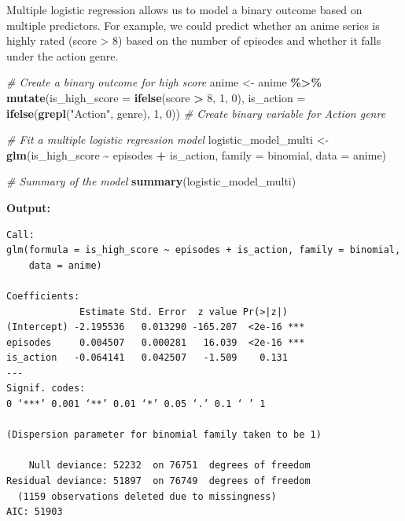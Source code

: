 \documentclass[
]{book}
\newenvironment{Shaded}{\begin{snugshade}}{\end{snugshade}}
\newcommand{\AttributeTok}[1]{\textcolor[rgb]{0.13,0.29,0.53}{#1}}
\newcommand{\CommentTok}[1]{\textcolor[rgb]{0.56,0.35,0.01}{\textit{#1}}}
\newcommand{\DecValTok}[1]{\textcolor[rgb]{0.00,0.00,0.81}{#1}}
\newcommand{\FunctionTok}[1]{\textcolor[rgb]{0.13,0.29,0.53}{\textbf{#1}}}
\newcommand{\NormalTok}[1]{#1}
\newcommand{\OtherTok}[1]{\textcolor[rgb]{0.56,0.35,0.01}{#1}}
\newcommand{\SpecialCharTok}[1]{\textcolor[rgb]{0.81,0.36,0.00}{\textbf{#1}}}
\newcommand{\StringTok}[1]{\textcolor[rgb]{0.31,0.60,0.02}{#1}}
\begin{document}
Multiple logistic regression allows us to model a binary outcome based on multiple predictors. For example, we could predict whether an anime series is highly rated (score \textgreater{} 8) based on the number of episodes and whether it falls under the action genre.

\begin{Shaded}
\begin{Highlighting}[]
\CommentTok{\# Create a binary outcome for high score}
\NormalTok{anime }\OtherTok{\textless{}{-}}\NormalTok{ anime }\SpecialCharTok{\%\textgreater{}\%}
  \FunctionTok{mutate}\NormalTok{(}\AttributeTok{is\_high\_score =} \FunctionTok{ifelse}\NormalTok{(score }\SpecialCharTok{\textgreater{}} \DecValTok{8}\NormalTok{, }\DecValTok{1}\NormalTok{, }\DecValTok{0}\NormalTok{),}
         \AttributeTok{is\_action =} \FunctionTok{ifelse}\NormalTok{(}\FunctionTok{grepl}\NormalTok{(}\StringTok{"Action"}\NormalTok{, genre), }\DecValTok{1}\NormalTok{, }\DecValTok{0}\NormalTok{))  }\CommentTok{\# Create binary variable for Action genre}

\CommentTok{\# Fit a multiple logistic regression model}
\NormalTok{logistic\_model\_multi }\OtherTok{\textless{}{-}} \FunctionTok{glm}\NormalTok{(is\_high\_score }\SpecialCharTok{\textasciitilde{}}\NormalTok{ episodes }\SpecialCharTok{+}\NormalTok{ is\_action, }\AttributeTok{family =}\NormalTok{ binomial, }\AttributeTok{data =}\NormalTok{ anime)}

\CommentTok{\# Summary of the model}
\FunctionTok{summary}\NormalTok{(logistic\_model\_multi)}
\end{Highlighting}
\end{Shaded}

\textbf{Output:}

\begin{verbatim}
Call:
glm(formula = is_high_score ~ episodes + is_action, family = binomial, 
    data = anime)

Coefficients:
             Estimate Std. Error  z value Pr(>|z|)    
(Intercept) -2.195536   0.013290 -165.207  <2e-16 ***
episodes     0.004507   0.000281   16.039  <2e-16 ***
is_action   -0.064141   0.042507   -1.509    0.131    
---
Signif. codes:  
0 ‘***’ 0.001 ‘**’ 0.01 ‘*’ 0.05 ‘.’ 0.1 ‘ ’ 1

(Dispersion parameter for binomial family taken to be 1)

    Null deviance: 52232  on 76751  degrees of freedom
Residual deviance: 51897  on 76749  degrees of freedom
  (1159 observations deleted due to missingness)
AIC: 51903
\end{verbatim}
\end{document}
